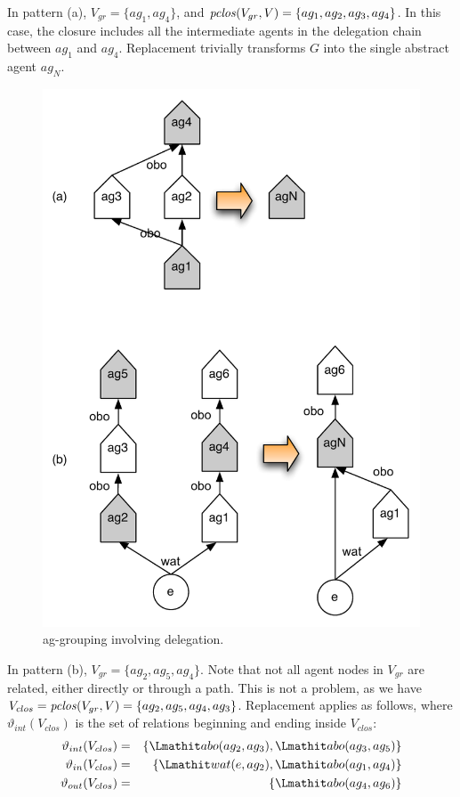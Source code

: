 In pattern (a), $V_{gr} = \{ ag_1, ag_4 \}$, and $\mathit{pclos}(V_{gr}, V) =  \{ ag_1, ag_2, ag_3, ag_4 \}$.
%
In this case, the closure includes all the intermediate agents in the delegation chain between $ag_1$ and $ag_4$.
%
Replacement trivially transforms $G$ into the single abstract agent $ag_N$.


\begin{figure}
\centering
\includegraphics[scale=.5]{figures/d-chains-abstracted}
\caption{ag-grouping involving delegation.}
\label{fig:d-chains-abstracted}
\end{figure}

In pattern (b), $V_{gr} = \{ ag_2, ag_5, ag_4 \}$.
%
Note that not all agent nodes in $V_{gr}$ are related, either directly or through a path. This is not a problem, as we have $V_{clos} = \mathit{pclos}(V_{gr}, V) =   \{ ag_2, ag_5, ag_4, ag_3 \}$. Replacement applies as follows, where $\vartheta_{int}(V_{clos})$ is the set of relations beginning and ending inside $V_{clos}$:
\begin{eqnarray*}
\vartheta_{int}(V_{clos}) & = & \{ \delegate(ag_2, ag_3), \delegate(ag_3, ag_5) \} \\
\vartheta_{in}(V_{clos}) & = & \{ \wat(e, ag_2), \delegate(ag_1, ag_4) \} \\
\vartheta_{out}(V_{clos}) & = & \{ \delegate(ag_4, ag_6) \}
\end{eqnarray*}

